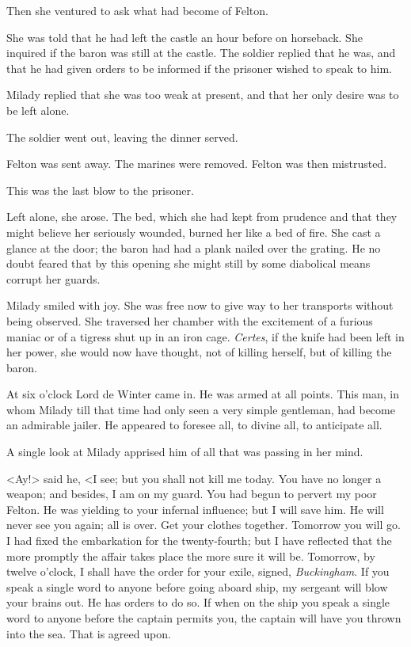 Then she ventured to ask what had become of Felton. 

She was told that he had left the castle an hour before on horseback. She inquired if the baron was still at the castle. The soldier replied that he was, and that he had given orders to be informed if the prisoner wished to speak to him. 

Milady replied that she was too weak at present, and that her only desire was to be left alone. 

The soldier went out, leaving the dinner served. 

Felton was sent away. The marines were removed. Felton was then mistrusted. 

This was the last blow to the prisoner. 

Left alone, she arose. The bed, which she had kept from prudence and that they might believe her seriously wounded, burned her like a bed of fire. She cast a glance at the door; the baron had had a plank nailed over the grating. He no doubt feared that by this opening she might still by some diabolical means corrupt her guards. 

Milady smiled with joy. She was free now to give way to her transports without being observed. She traversed her chamber with the excitement of a furious maniac or of a tigress shut up in an iron cage. \textit{Certes}, if the knife had been left in her power, she would now have thought, not of killing herself, but of killing the baron. 

At six o'clock Lord de Winter came in. He was armed at all points. This man, in whom Milady till that time had only seen a very simple gentleman, had become an admirable jailer. He appeared to foresee all, to divine all, to anticipate all. 

A single look at Milady apprised him of all that was passing in her mind. 

<Ay!> said he, <I see; but you shall not kill me today. You have no longer a weapon; and besides, I am on my guard. You had begun to pervert my poor Felton. He was yielding to your infernal influence; but I will save him. He will never see you again; all is over. Get your clothes together. Tomorrow you will go. I had fixed the embarkation for the twenty-fourth; but I have reflected that the more promptly the affair takes place the more sure it will be. Tomorrow, by twelve o'clock, I shall have the order for your exile, signed, \textit{Buckingham}. If you speak a single word to anyone before going aboard ship, my sergeant will blow your brains out. He has orders to do so. If when on the ship you speak a single word to anyone before the captain permits you, the captain will have you thrown into the sea. That is agreed upon. 

